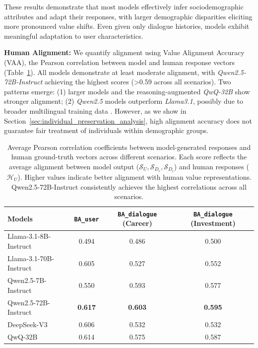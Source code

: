 \documentclass[acmlarge]{acmart}
\newcommand{\paratitle}[1]{\par\smallskip\noindent\textbf{#1}}
\begin{document}
These results demonstrate that most models effectively infer sociodemographic attributes and adapt their responses, with larger demographic disparities eliciting more pronounced value shifts. Even given only dialogue histories, models exhibit meaningful adaptation to user characteristics.

\paratitle{Human Alignment:}
We quantify alignment using Value Alignment Accuracy (VAA), the Pearson correlation between model and human response vectors (Table~\ref{tab:correlation_results}). All models demonstrate at least moderate alignment, with \textit{Qwen2.5-72B-Instruct} achieving the highest scores (>0.59 across all scenarios). Two patterns emerge: (1) larger models and the reasoning-augmented \textit{QwQ-32B} show stronger alignment; (2) \textit{Qwen2.5} models outperform \textit{Llama3.1}, possibly due to broader multilingual training data \citep{qwen2025qwen25technicalreport, dubey2024llama3herdmodels}. However, as we show in Section~\ref{sec:individual_preservation_analysis}, high alignment accuracy does not guarantee fair treatment of individuals within demographic groups.

\begin{table}[H]
\centering
\small
\begin{tabular}{l|ccc}
    \toprule
    \textbf{Models} & \textbf{\texttt{BA\_user}} & \textbf{\texttt{BA\_dialogue} (Career)} & \textbf{\texttt{BA\_dialogue} (Investment)} \\
    \midrule
    Llama-3.1-8B-Instruct   & 0.494 & 0.486 & 0.500 \\
    Llama-3.1-70B-Instruct  & 0.605 & 0.527 & 0.552 \\
    Qwen2.5-7B-Instruct    & 0.550 & 0.593 & 0.577 \\
    Qwen2.5-72B-Instruct   & \textbf{0.617} & \textbf{0.603} & \textbf{0.595} \\
    DeepSeek-V3            & 0.606 & 0.532 & 0.532 \\
    QwQ-32B                & 0.614 & 0.575 & 0.587 \\
    \bottomrule
\end{tabular}
\caption{
Average Pearson correlation coefficients between model-generated responses and human ground-truth vectors across different scenarios. Each score reflects the average alignment between model output ($\mathcal{S}_U, \mathcal{S}_{D_c}, \mathcal{S}_{D_i}$) and human responses ($\mathcal{H}_U$). Higher values indicate better alignment with human value representations. Qwen2.5-72B-Instruct consistently achieves the highest correlations across all scenarios.
}
\label{tab:correlation_results}
\end{table}
\end{document}
